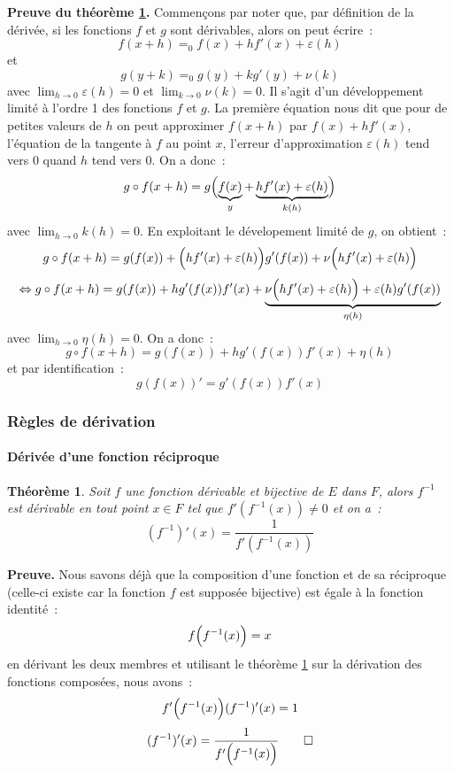 \documentclass[10pt,notheorems]{beamer}
\theoremstyle{plain}
\newtheorem{theorem}{Théorème}
\theoremstyle{definition} %
\begin{document}
\begin{notes}
  \textbf{Preuve du théorème \hyperlink{slide_derivee_composition_1}{\ref{thm:composition}}.} Commençons par noter que, par définition de la dérivée, si les fonctions $f$ et $g$ sont dérivables, alors on peut écrire~:
  \[
    f(x+h) =_0 f(x) + hf'(x) + \varepsilon(h)
  \]
  et
  \[
    g(y+k) =_0 g(y) + kg'(y) + \nu(k)
  \]
  avec $\lim_{h\rightarrow 0}\varepsilon(h)=0$ et $\lim_{k\rightarrow 0}\nu(k)=0$. Il s'agit d'un développement limité à l'ordre 1 des fonctions $f$ et $g$. La première équation nous dit que pour de petites valeurs de $h$ on peut approximer $f(x+h)$ par $f(x) + hf'(x)$, l'équation de la tangente à $f$ au point $x$, l'erreur d'approximation $\varepsilon(h)$ tend vers 0 quand $h$ tend vers 0. On a donc~:
  \[
    g\circ f(x+h) = g\Bigl(\underbrace{f(x)}_{y}+\underbrace{hf'(x) + \varepsilon(h)}_{k(h)}\Bigr)
  \]
  avec $\lim_{h\rightarrow 0}k(h) = 0$. En exploitant le dévelopement limité de $g$, on obtient~:
  \[
    g\circ f(x+h) = g(f(x)) + \Bigl( hf'(x) + \varepsilon(h) \Bigr) g'(f(x)) + \nu\Bigl( hf'(x) + \varepsilon(h) \Bigr)
  \]
  \[
    \Leftrightarrow g\circ f(x+h) = g(f(x)) + h g'(f(x))f'(x) + \underbrace{\nu\Bigl( hf'(x) + \varepsilon(h) \Bigr)+\varepsilon(h)g'(f(x))}_{\eta(h)}
  \]
  avec $\lim_{h\rightarrow 0}\eta(h) = 0$. On a donc~:
  \[
    g\circ f(x+h) = g(f(x)) + h g'(f(x))f'(x) + \eta(h)
  \]
  et par identification~:
  \[
    g(f(x))' = g'(f(x))f'(x)
  \]

\end{notes}


\begin{frame}
  \frametitle{Règles de dérivation}
  \framesubtitle{Dérivée d'une fonction réciproque}
  \hypertarget{slide_derivee_reciproque_1}{}

  \begin{theorem}\label{thm:composition}
    Soit $f$ une fonction dérivable et bijective de $E$ dans $F$, alors $f^{-1}$ est dérivable en tout point $x\in F$ tel que $f'(f^{-1}(x))\neq 0$ et on a~:
    \[
      (f^{-1})'(x) = \frac{1}{f'(f^{-1}(x))}
    \]
  \end{theorem}

  \bigskip

  {\small \textbf{Preuve.} Nous savons déjà que la composition d'une fonction et de sa réciproque (celle-ci existe car la fonction $f$ est supposée bijective) est égale à la fonction identité~:
    \[
      f\Bigl(f^{-1}(x)\Bigr) = x
    \]
    en dérivant les deux membres et utilisant le théorème \hyperlink{slide_derivee_composition_1}{\ref{thm:composition}} sur la dérivation des fonctions composées, nous avons~:
    \[
      f'\Bigl(f^{-1}(x)\Bigr)(f^{-1})'(x)  = 1
    \]
    \[
      (f^{-1})'(x)  = \frac{1}{f'\Bigl(f^{-1}(x)\Bigr)}\qed
    \]
  }

\end{frame}
\end{document}
